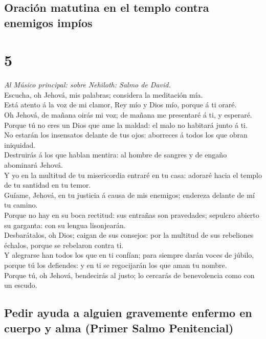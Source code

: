 \hypertarget{oraciuxf3n-matutina-en-el-templo-contra-enemigos-impuxedos}{%
\subsection{Oración matutina en el templo contra enemigos
impíos}\label{oraciuxf3n-matutina-en-el-templo-contra-enemigos-impuxedos}}

\hypertarget{section-4}{%
\section{5}\label{section-4}}

 \emph{Al Músico principal: sobre Nehiloth: Salmo de
David.}\\
Escucha, oh Jehová, mis palabras; considera la meditación mía.\\
 Está atento á la voz de mi clamor, Rey mío y Dios mío,
porque á ti oraré.\\
 Oh Jehová, de mañana oirás mi voz; de mañana me presentaré
á ti, y esperaré.\\
 Porque tú no eres un Dios que ame la maldad: el malo no
habitará junto á ti.\\
 No estarán los insensatos delante de tus ojos: aborreces á
todos los que obran iniquidad.\\
 Destruirás á los que hablan mentira: al hombre de sangres y
de engaño abominará Jehová.\\
 Y yo en la multitud de tu misericordia entraré en tu casa:
adoraré hacia el templo de tu santidad en tu temor.\\
 Guíame, Jehová, en tu justicia á causa de mis enemigos;
endereza delante de mí tu camino.\\
 Porque no hay en su boca rectitud: sus entrañas son
pravedades; sepulcro abierto su garganta: con su lengua lisonjearán.\\
 Desbarátalos, oh Dios; caigan de sus consejos: por la
multitud de sus rebeliones échalos, porque se rebelaron contra ti.\\
 Y alegrarse han todos los que en ti confían; para siempre
darán voces de júbilo, porque tú los defiendes: y en ti se regocijarán
los que aman tu nombre.\\
 Porque tú, oh Jehová, bendecirás al justo; lo cercarás de
benevolencia como con un escudo.

\hypertarget{pedir-ayuda-a-alguien-gravemente-enfermo-en-cuerpo-y-alma-primer-salmo-penitencial}{%
\subsection{Pedir ayuda a alguien gravemente enfermo en cuerpo y alma
(Primer Salmo
Penitencial)}\label{pedir-ayuda-a-alguien-gravemente-enfermo-en-cuerpo-y-alma-primer-salmo-penitencial}}

